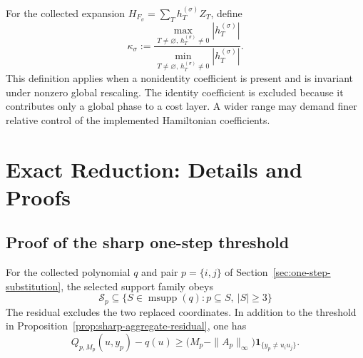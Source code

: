 \documentclass[a4paper,onecolumn,11pt,unpublished]{quantumarticle}
\theoremstyle{remark}
\begin{document}
For the collected expansion
$H_{F_\sigma}=\sum_T h_T^{(\sigma)}Z_T$, define
\begin{equation}
  \kappa_\sigma:=
  \frac{\max_{T\ne\varnothing,\,h_T^{(\sigma)}\ne0}|h_T^{(\sigma)}|}
       {\min_{T\ne\varnothing,\,h_T^{(\sigma)}\ne0}|h_T^{(\sigma)}|}.
  \label{eq:pauli-dynamic-range}
\end{equation}
This definition applies when a nonidentity coefficient is present and is
invariant under nonzero global rescaling. The identity coefficient is
excluded because it contributes only a global phase to a cost layer.
A wider range may demand finer relative control of the implemented
Hamiltonian coefficients.

\section{Exact Reduction: Details and Proofs}
\label{app:general-reduction-proof}

\subsection{Proof of the sharp one-step threshold}
\label{app:sharp-one-step-proof}

For the collected polynomial $q$ and pair $p=\{i,j\}$ of
Section~\ref{sec:one-step-substitution}, the selected support family obeys
\begin{equation}
  \mathcal{S}_p\subseteq
  \{S\in\operatorname{msupp}(q):p\subseteq S,\ |S|\geq3\}
  \label{eq:selected-family-one-step}
\end{equation}
The residual excludes the two replaced coordinates. In addition to the
threshold in Proposition~\ref{prop:sharp-aggregate-residual}, one has
\begin{equation}
  Q_{p,M_p}(u,y_p)-q(u)
  \geq
  \bigl(M_p-\|A_p\|_\infty\bigr)
  \mathbf{1}_{\{y_p\neq u_i u_j\}}.
  \label{eq:one-step-margin}
\end{equation}
\end{document}
